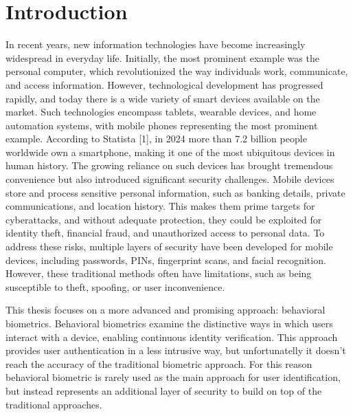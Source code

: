 \documentclass{article}
\begin{document}
\begin{abstract}
\setlength{\parindent}{0pt}
\setlength{\parskip}{0.7\baselineskip}
\noindent


\end{abstract}
\newpage

\section{Introduction}
\setlength{\parindent}{0pt}
\setlength{\parskip}{0.7\baselineskip}
In recent years, new information technologies have become increasingly widespread in everyday life. 
Initially, the most prominent example was the personal computer, which revolutionized the way individuals work, communicate, and access information.
However, technological development has progressed rapidly, and today there is a wide variety of smart devices available on the market.
Such technologies encompass tablets, wearable devices, and home automation systems, with mobile phones representing the most prominent example.
According to Statista [1], in 2024 more than 7.2 billion people worldwide own a smartphone, making it one of the most ubiquitous devices in human history.
The growing reliance on such devices has brought tremendous convenience but also introduced significant security challenges. 
Mobile devices store and process sensitive personal information, such as banking details, private communications, and location history. 
This makes them prime targets for cyberattacks, and without adequate protection, they could be exploited for identity theft, financial fraud, and unauthorized access to personal data.
To address these risks, multiple layers of security have been developed for mobile devices, including passwords, PINs, fingerprint scans, and facial recognition.
However, these traditional methods often have limitations, such as being susceptible to theft, spoofing, or user inconvenience. 

This thesis focuses on a more advanced and promising approach: behavioral biometrics.
Behavioral biometrics examine the distinctive ways in which users interact with a device, enabling continuous identity verification.
This approach provides user authentication in a less intrusive way, but unfortunatelly it doesn't reach the accuracy of the traditional biometric approach.
For this reason behavioral biometric is rarely used as the main approach for user identification, but instead represents an additional layer of security to build on top of the traditional approaches.
\end{document}
